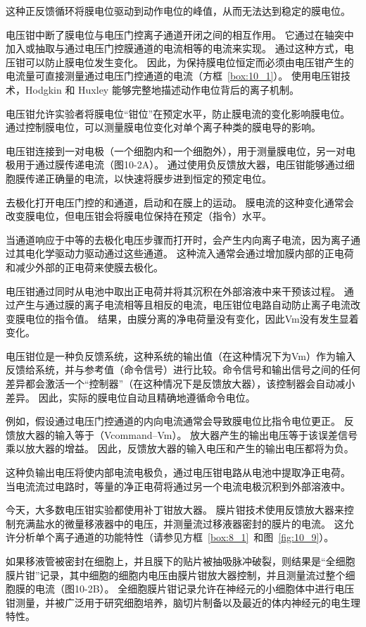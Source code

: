这种正反馈循环将膜电位驱动到动作电位的峰值，从而无法达到稳定的膜电位。


电压钳中断了膜电位与电压门控离子通道开闭之间的相互作用。
它通过在轴突中加入或抽取与通过电压门控膜通道的电流相等的电流来实现。
通过这种方式，电压钳可以防止膜电位发生变化。
因此，为保持膜电位恒定而必须由电压钳产生的电流量可直接测量通过电压门控通道的电流（方框~\ref{box:10_1}）。
使用电压钳技术，Hodgkin 和 Huxley 能够完整地描述动作电位背后的离子机制。


\begin{proposition}[电压钳技术] \label{box:10_1}
	
	\quad \quad 电压钳允许实验者将膜电位“钳位”在预定水平，防止膜电流的变化影响膜电位。
	通过控制膜电位，可以测量膜电位变化对单个离子种类的膜电导的影响。
	
	\quad \quad 电压钳连接到一对电极（一个细胞内和一个细胞外），用于测量膜电位，另一对电极用于通过膜传递电流（图10-2A）。
	通过使用负反馈放大器，电压钳能够通过细胞膜传递正确量的电流，以快速将膜步进到恒定的预定电位。
	
	\quad \quad 去极化打开电压门控的和通道，启动和在膜上的运动。
	膜电流的这种变化通常会改变膜电位，但电压钳会将膜电位保持在预定（指令）水平。
	
	\quad \quad 当通道响应于中等的去极化电压步骤而打开时，会产生内向离子电流，因为离子通过其电化学驱动力驱动通过这些通道。
	这种流入通常会通过增加膜内部的正电荷和减少外部的正电荷来使膜去极化。
	
	\quad \quad 电压钳通过同时从电池中取出正电荷并将其沉积在外部溶液中来干预该过程。
	通过产生与通过膜的离子电流相等且相反的电流，电压钳位电路自动防止离子电流改变膜电位的指令值。
	结果，由膜分离的净电荷量没有变化，因此Vm没有发生显着变化。
	
	\quad \quad 电压钳位是一种负反馈系统，这种系统的输出值（在这种情况下为Vm）作为输入反馈给系统，并与参考值（命令信号）进行比较。命令信号和输出信号之间的任何差异都会激活一个“控制器”（在这种情况下是反馈放大器），该控制器会自动减小差异。
	因此，实际的膜电位自动且精确地遵循命令电位。
	
	\quad \quad 例如，假设通过电压门控通道的内向电流通常会导致膜电位比指令电位更正。
	反馈放大器的输入等于（Vcommand–Vm）。
	放大器产生的输出电压等于该误差信号乘以放大器的增益。
	因此，反馈放大器的输入电压和产生的输出电压都将为负。
	
	\quad \quad 这种负输出电压将使内部电流电极负，通过电压钳电路从电池中提取净正电荷。
	当电流流过电路时，等量的净正电荷将通过另一个电流电极沉积到外部溶液中。
	
	\quad \quad 今天，大多数电压钳实验都使用补丁钳放大器。
	膜片钳技术使用反馈放大器来控制充满盐水的微量移液器中的电压，并测量流过移液器密封的膜片的电流。
	这允许分析单个离子通道的功能特性（请参见方框~\ref{box:8_1}~和图~\ref{fig:10_9}）。
	
	\quad \quad 如果移液管被密封在细胞上，并且膜下的贴片被抽吸脉冲破裂，则结果是“全细胞膜片钳”记录，其中细胞的细胞内电压由膜片钳放大器控制，并且测量流过整个细胞膜的电流（图10-2B）。
	全细胞膜片钳记录允许在神经元的小细胞体中进行电压钳测量，并被广泛用于研究细胞培养，脑切片制备以及最近的体内神经元的电生理特性。
	
\end{proposition}
